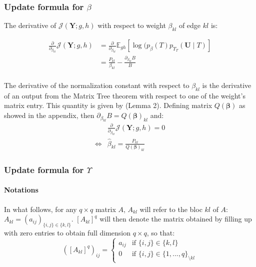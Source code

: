 \documentclass[11pt,a4paper]{article}
\newcommand{\betabf}{\boldsymbol{\beta}}
\newcommand{\Ybf}{\boldsymbol{Y}}
\newcommand{\Ubf}{\boldsymbol{U}}
\newcommand{\Esp}{\mathds{E}}
\begin{document}
 \subsubsection{Update formula for $\beta$}
 The derivative of $ \mathcal{J}(\Ybf ; g,h)$ with respect to weight $\beta_{kl}$ of edge $kl$ is:
 
 \begin{align*}
\frac{\partial}{\partial_{\beta_{kl}}} \mathcal{J}(\Ybf ; g,h) &=  \frac{\partial}{\partial_{\beta_{kl}}} \Esp_{gh} [\log (p_\beta(T)p_{\Upsilon_T}(\Ubf\mid T) ] \\
&= \frac{P_{kl}}{\beta_{kl}} - \frac{\partial_{\beta_{kl}} B }{B} \\
\end{align*}

The derivative of the normalization constant with respect to $\beta_{kl}$ is the derivative of an output from the Matrix Tree theorem with respect to one of the weight's matrix entry. This quantity is given by \citet{Meila} (Lemma 2). Defining matrix $Q(\betabf)$ as showed in the appendix, then $\partial_{\beta_{kl}} B = Q(\betabf)_{kl}$ and:
 \begin{align*}
&\frac{\partial}{\partial_{\beta_{kl}}} \mathcal{J}(\Ybf ; g,h) 
=0 \\
\iff & \boxed{\widehat{\beta}_{kl} = \frac{P_{kl}}{ Q(\betabf)_{kl}} }
\end{align*}
 \subsubsection{Update formula for $\Upsilon$}
 \paragraph{Notations\\}
In what follows, for any $q\times q$  matrix $A$, $A_{kl}$ will refer to the bloc $kl$ of $A$: $A_{kl}=(a_{ij})_{\{i,j\}\in\{k,l\}}$.   $[A_{kl}]^q$ will then denote the matrix obtained by filling up with zero entries to obtain full dimension $q\times q$, so that:
$$([A_{kl}]^q )_{ij}=\left\{ \begin{array}{rl}
a_{ij} & \text{if } \{i,j\}\in\{k,l\}\\
0 &  \text{if } \{i,j\}\in\{1,..., q\}_{\setminus kl}
\end{array}\right.$$

 
\end{document}
